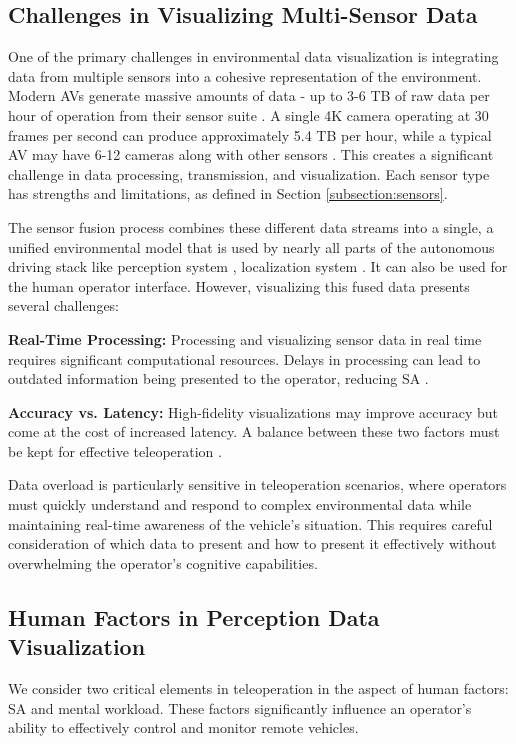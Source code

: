\subsection{Challenges in Visualizing Multi-Sensor Data}\label{subsection:challengesmultisensor}
One of the primary challenges in environmental data visualization is integrating data from multiple
sensors into a cohesive representation of the environment. Modern \acp{AV} generate
massive amounts of data - up to 3-6 TB of raw data per hour of operation from their sensor suite \cite{kazhamiaka2021challenges}
. A single 4K camera operating at 30 frames per second can produce
approximately 5.4 TB per hour, while a typical AV may have 6-12 cameras along with other sensors \cite{visualcapitalist2024}
. This creates a significant challenge in data processing, transmission,
and visualization. Each sensor type has strengths and limitations, as defined in Section \ref{subsection:sensors}.

The sensor fusion process combines these different data streams into a single, a unified environmental
model that is used by nearly all parts of the autonomous driving stack like perception system \cite{feng2020deep}
, localization system \cite{feng2020deep, el-sheimy2020sensorfusion}. It can also be used for the human operator interface.
However, visualizing this fused data presents several challenges:

\textbf{Real-Time Processing:} Processing and visualizing sensor data in real time requires significant computational resources. Delays in processing can lead to outdated information being presented to the operator, reducing \ac{SA} \cite{Gnatzig}.

\textbf{Accuracy vs. Latency:} High-fidelity visualizations may improve accuracy but come at the cost of increased latency. A balance between these two factors must be kept for effective teleoperation \cite{chucholowski2014teleoperated}.

Data overload is particularly sensitive in teleoperation scenarios, where operators must quickly understand and respond to complex environmental data while maintaining real-time awareness of the vehicle's situation. This requires careful consideration of which data to present and how to present it effectively without overwhelming the operator's cognitive capabilities.

\subsection{Human Factors in Perception Data Visualization}\label{subsection:humanfactors}
We consider two critical elements in teleoperation in the aspect of human factors: \ac{SA} and mental workload. These factors significantly influence an operator's ability to effectively control and monitor remote vehicles.

